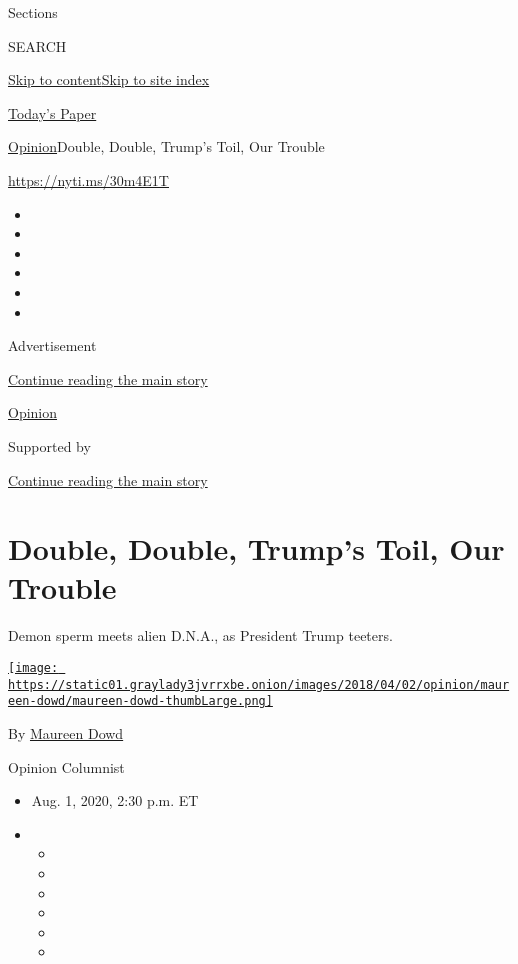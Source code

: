 Sections

SEARCH

\protect\hyperlink{site-content}{Skip to
content}\protect\hyperlink{site-index}{Skip to site index}

\href{https://myaccount.nytimes3xbfgragh.onion/auth/login?response_type=cookie\&client_id=vi}{}

\href{https://www.nytimes3xbfgragh.onion/section/todayspaper}{Today's
Paper}

\href{/section/opinion}{Opinion}\textbar{}Double, Double, Trump's Toil,
Our Trouble

\url{https://nyti.ms/30m4E1T}

\begin{itemize}
\item
\item
\item
\item
\item
\item
\end{itemize}

Advertisement

\protect\hyperlink{after-top}{Continue reading the main story}

\href{/section/opinion}{Opinion}

Supported by

\protect\hyperlink{after-sponsor}{Continue reading the main story}

\hypertarget{double-double-trumps-toil-our-trouble}{%
\section{Double, Double, Trump's Toil, Our
Trouble}\label{double-double-trumps-toil-our-trouble}}

Demon sperm meets alien D.N.A., as President Trump teeters.

\href{https://www.nytimes3xbfgragh.onion/by/maureen-dowd}{\texttt{[image: https://static01.graylady3jvrrxbe.onion/images/2018/04/02/opinion/maureen-dowd/maureen-dowd-thumbLarge.png]}}

By \href{https://www.nytimes3xbfgragh.onion/by/maureen-dowd}{Maureen
Dowd}

Opinion Columnist

\begin{itemize}
\item
  Aug. 1, 2020, 2:30 p.m. ET
\item
  \begin{itemize}
  \item
  \item
  \item
  \item
  \item
  \item
  \end{itemize}
\end{itemize}

